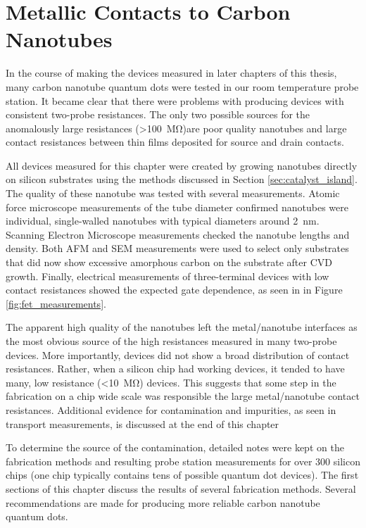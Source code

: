 \chapter{Metallic Contacts to Carbon Nanotubes}
\label{sec:contacts}

In the course of making the devices measured in later chapters of this thesis, many carbon nanotube quantum dots were tested in our room temperature probe station. It became clear that there were problems with producing devices with consistent two-probe resistances. The only two possible sources for the anomalously large resistances (>\SI{100}{\mega\ohm})are poor quality nanotubes and large contact resistances between thin films deposited for source and drain contacts. 

All devices measured for this chapter were created by growing nanotubes directly on silicon substrates using the methods discussed in Section \ref{sec:catalyst_island}. The quality of these nanotube was tested with several measurements. Atomic force microscope measurements of the tube diameter confirmed nanotubes were individual, single-walled nanotubes with typical diameters around \SI{2}{\nano\meter}. Scanning Electron Microscope measurements checked the nanotube lengths and density. Both AFM and SEM measurements were used to select only substrates that did now show excessive amorphous carbon on the substrate after CVD growth. Finally, electrical measurements of three-terminal devices with low contact resistances showed the expected gate dependence, as seen in in Figure \ref{fig:fet_measurements}.

The apparent high quality of the nanotubes left the metal/nanotube interfaces as the most obvious source of the high resistances measured in many two-probe devices. More importantly, devices did not show a broad distribution of contact resistances. Rather, when a silicon chip had working devices, it tended to have many, low resistance (<\SI{10}{\mega\ohm}) devices. This suggests that some step in the fabrication on a chip wide scale was responsible the large metal/nanotube contact resistances. Additional evidence for contamination and impurities, as seen in transport measurements, is discussed at the end of this chapter

To determine the source of the contamination, detailed notes were kept on the fabrication methods and resulting probe station measurements for over 300 silicon chips (one chip typically contains tens of possible quantum dot devices). The first sections of this chapter discuss the results of several fabrication methods. Several recommendations are made for producing more reliable carbon nanotube quantum dots.

